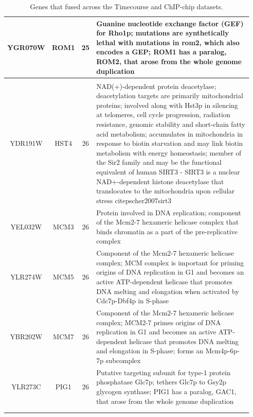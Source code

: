 \documentclass[]{article}
\begin{document}
\begin{longtable}{@{\extracolsep{3pt}} cccp{85mm}}
YGR070W & ROM1 & 25 & Guanine nucleotide exchange factor (GEF) for Rho1p; mutations are synthetically lethal with mutations in rom2, which also encodes a GEP; ROM1 has a paralog, ROM2, that arose from the whole genome duplication \\   \hline \\ [-1.8ex] 
YDR191W & HST4 & 26 & NAD(+)-dependent protein deacetylase; deacetylation targets are primarily mitochondrial proteins; involved along with Hst3p in silencing at telomeres, cell cycle progression, radiation resistance, genomic stability and short-chain fatty acid metabolism; accumulates in mitochondria in response to biotin starvation and may link biotin metabolism with energy homeostasis; member of the Sir2 family and may be the functional equivalent of human SIRT3 - SIRT3 is a nuclear NAD+-dependent histone deacetylase that translocates to the mitochondria upon cellular stress citep{scher2007sirt3} \\ 
YEL032W & MCM3 & 26 & Protein involved in DNA replication; component of the Mcm2-7 hexameric helicase complex that binds chromatin as a part of the pre-replicative complex \\ 
YLR274W & MCM5 & 26 & Component of the Mcm2-7 hexameric helicase complex; MCM complex is important for priming origins of DNA replication in G1 and becomes an active ATP-dependent helicase that promotes DNA melting and elongation when activated by Cdc7p-Dbf4p in S-phase \\ 
YBR202W & MCM7 & 26 & Component of the Mcm2-7 hexameric helicase complex; MCM2-7 primes origins of DNA replication in G1 and becomes an active ATP-dependent helicase that promotes DNA melting and elongation in S-phase; forms an Mcm4p-6p-7p subcomplex \\ 
YLR273C & PIG1 & 26 & Putative targeting subunit for type-1 protein phosphatase Glc7p; tethers Glc7p to Gsy2p glycogen synthase; PIG1 has a paralog, GAC1, that arose from the whole genome duplication \\ 
\hline \\[-1.8ex] 
\caption{Genes that fused across the Timecourse and ChIP-chip datasets.}
\label{tab:timecoursChIPchipFused}
\end{longtable} 
\end{document}
